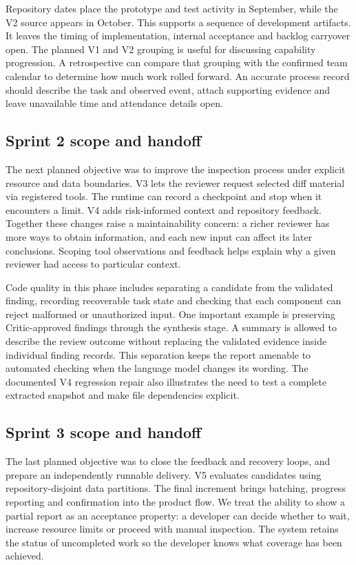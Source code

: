 \documentclass[journal,compsoc]{IEEEtran}
\begin{document}
Repository dates place the prototype and test activity in September, while the V2 source appears in October. This supports a sequence of development artifacts. It leaves the timing of implementation, internal acceptance and backlog carryover open. The planned V1 and V2 grouping is useful for discussing capability progression. A retrospective can compare that grouping with the confirmed team calendar to determine how much work rolled forward. An accurate process record should describe the task and observed event, attach supporting evidence and leave unavailable time and attendance details open.

\subsection{Sprint 2 scope and handoff}
The next planned objective was to improve the inspection process under explicit resource and data boundaries. V3 lets the reviewer request selected diff material via registered tools. The runtime can record a checkpoint and stop when it encounters a limit. V4 adds risk-informed context and repository feedback. Together these changes raise a maintainability concern: a richer reviewer has more ways to obtain information, and each new input can affect its later conclusions. Scoping tool observations and feedback helps explain why a given reviewer had access to particular context.

Code quality in this phase includes separating a candidate from the validated finding, recording recoverable task state and checking that each component can reject malformed or unauthorized input. One important example is preserving Critic-approved findings through the synthesis stage. A summary is allowed to describe the review outcome without replacing the validated evidence inside individual finding records. This separation keeps the report amenable to automated checking when the language model changes its wording. The documented V4 regression repair also illustrates the need to test a complete extracted snapshot and make file dependencies explicit.

\subsection{Sprint 3 scope and handoff}
The last planned objective was to close the feedback and recovery loops, and prepare an independently runnable delivery. V5 evaluates candidates using repository-disjoint data partitions. The final increment brings batching, progress reporting and confirmation into the product flow. We treat the ability to show a partial report as an acceptance property: a developer can decide whether to wait, increase resource limits or proceed with manual inspection. The system retains the status of uncompleted work so the developer knows what coverage has been achieved.
\end{document}
